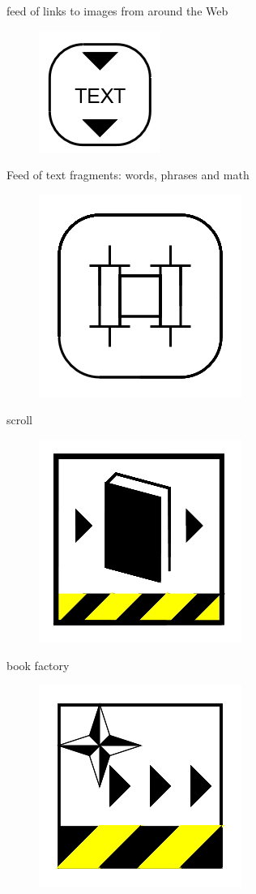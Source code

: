 \documentclass[11pt]{article}
\begin{document}
feed of links to images from around the Web
\begin{figure}
\includegraphics[scale=0.3]{image4.png}
\end{figure}
Feed of text fragments: words, phrases and math
\begin{figure}
\includegraphics[scale=0.3]{image5.png}
\end{figure}
scroll
\begin{figure}
\includegraphics[scale=0.3]{image6.png}
\end{figure}
book factory
\begin{figure}
\includegraphics[scale=0.3]{image7.png}
\end{figure}
\end{document}
